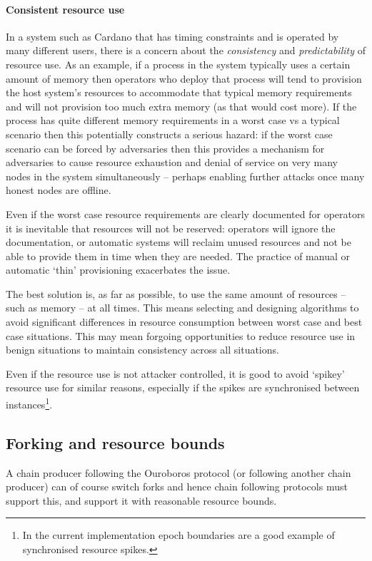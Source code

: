 \documentclass{article}
\theoremstyle{definition}{
  \newtheorem{lemma}{Lemma}[section] %
  \newtheorem{definition}[lemma]{Definition}
}
\theoremstyle{theorem}{
  \newtheorem{invariant}[lemma]{Invariant}
  \newtheorem{proofobligation}[lemma]{Proof Obligation}
}
\numberwithin{equation}{lemma}
\begin{document}
\paragraph{Consistent resource use}
In a system such as Cardano that has timing constraints and is operated by many
different users, there is a concern about the \emph{consistency} and
\emph{predictability} of resource use. As an example, if a process in the system
typically uses a certain amount of memory then operators who deploy that
process will tend to provision the host system's resources to accommodate that
typical memory requirements and will not provision too much extra memory (as
that would cost more). If the process has quite different memory requirements in
a worst case vs a typical scenario then this potentially constructs a serious
hazard: if the worst case scenario can be forced by adversaries then this
provides a mechanism for adversaries to cause resource exhaustion and denial
of service on very many nodes in the system simultaneously -- perhaps enabling
further attacks once many honest nodes are offline.

Even if the worst case resource requirements are clearly documented for
operators it is inevitable that resources will not be reserved: operators will
ignore the documentation, or automatic systems will reclaim unused resources
and not be able to provide them in time when they are needed. The practice of
manual or automatic `thin' provisioning exacerbates the issue.

The best solution is, as far as possible, to use the same amount of resources --
such as memory -- at all times. This means selecting and designing algorithms
to avoid significant differences in resource consumption between worst case and
best case situations. This may mean forgoing opportunities to reduce resource
use in benign situations to maintain consistency across all situations.

Even if the resource use is not attacker controlled, it is good to avoid
`spikey' resource use for similar reasons, especially if the spikes are
synchronised between instances\footnote{In the current implementation epoch
boundaries are a good example of synchronised resource spikes.}.

\subsection{Forking and resource bounds}

A chain producer following the Ouroboros protocol (or following another chain
producer) can of course switch forks and hence chain following protocols must
support this, and support it with reasonable resource bounds.
\end{document}
